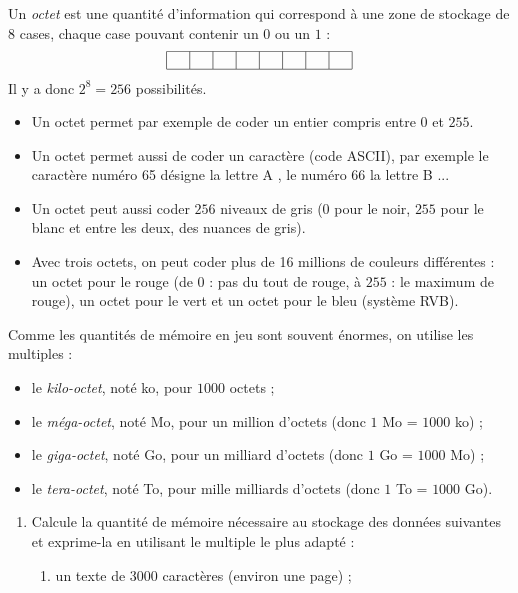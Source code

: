 \documentclass[class=report,crop=false, 12pt]{standalone}
\begin{document}
\begin{activite}
Un \emph{octet} est une quantité d'information qui correspond à une zone de stockage de $8$ cases, chaque case pouvant contenir un $0$ ou un $1$ :
   $$\begin{array}{|c|c|c|c|c|c|c|c|}
  \hline
    \ \   &  \ \  & \ \  & \ \  & \ \   &  \ \  & \ \  & \ \ \\ 
  \hline
\end{array}
$$
Il y a donc $2^8 = 256$ possibilités. 
\begin{itemize}
  \item Un octet permet par exemple de coder un entier compris entre $0$ et $255$. 
  \item Un octet permet aussi de coder un caractère (code ASCII), par exemple le caractère numéro 65 désigne la lettre \og A \fg{}, le numéro 66 la lettre \og B \fg{}... 
  \item Un octet peut aussi coder $256$ niveaux de gris ($0$ pour le noir, $255$ pour le blanc et entre les deux, des nuances de gris).
  \item Avec trois octets, on peut coder plus de 16 millions de couleurs différentes :
  un octet pour le rouge (de $0$ : pas du tout de rouge, à $255$ : le maximum de rouge), un octet pour le vert et un octet pour le bleu (système RVB).
\end{itemize}  

Comme les quantités de mémoire en jeu sont souvent énormes, on utilise les multiples :
\begin{itemize}
  \item le \emph{kilo-octet}, noté ko, pour $1000$ octets ;
  \item le \emph{méga-octet}, noté Mo, pour un million d'octets (donc $1$ Mo = $1000$ ko) ;
  \item le \emph{giga-octet}, noté Go, pour un milliard d'octets (donc $1$ Go = $1000$ Mo) ; 
  \item le \emph{tera-octet}, noté To, pour mille milliards d'octets (donc $1$ To = $1000$ Go).
\end{itemize}

\begin{enumerate}
  \item Calcule la quantité de mémoire nécessaire au stockage des données suivantes et exprime-la en utilisant le multiple le plus adapté :
  \begin{enumerate}
    \item un texte de 3000 caractères (environ une page) ;
    

\end{enumerate}
\end{enumerate}
\end{activite}
\end{document}
